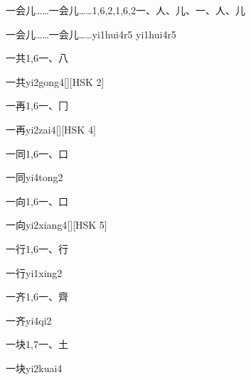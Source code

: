 \begin{entry}{一会儿……一会儿……}{1,6,2,1,6,2}{⼀、⼈、⼉、⼀、⼈、⼉}
  \begin{phonetics}{一会儿……一会儿……}{yi1hui4r5 yi1hui4r5}
  \end{phonetics}
\end{entry}

\begin{entry}{一共}{1,6}{⼀、⼋}
  \begin{phonetics}{一共}{yi2gong4}[][HSK 2]
  \end{phonetics}
\end{entry}

\begin{entry}{一再}{1,6}{⼀、⼌}
  \begin{phonetics}{一再}{yi2zai4}[][HSK 4]
  \end{phonetics}
\end{entry}

\begin{entry}{一同}{1,6}{⼀、⼝}
  \begin{phonetics}{一同}{yi4tong2}
  \end{phonetics}
\end{entry}

\begin{entry}{一向}{1,6}{⼀、⼝}
  \begin{phonetics}{一向}{yi2xiang4}[][HSK 5]
  \end{phonetics}
\end{entry}

\begin{entry}{一行}{1,6}{⼀、⾏}
  \begin{phonetics}{一行}{yi1xing2}
  \end{phonetics}
\end{entry}

\begin{entry}{一齐}{1,6}{⼀、⿑}
  \begin{phonetics}{一齐}{yi4qi2}
  \end{phonetics}
\end{entry}

\begin{entry}{一块}{1,7}{⼀、⼟}
  \begin{phonetics}{一块}{yi2kuai4}
  \end{phonetics}
\end{entry}

